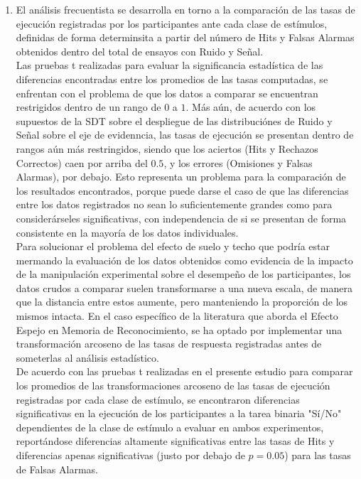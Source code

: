 \begin{enumerate}
\item El análisis frecuentista se desarrolla en torno a la comparación de las tasas de ejecución registradas por los participantes ante cada clase de estímulos, definidas de forma determinsita a partir del número de Hits y Falsas Alarmas obtenidos dentro del total de ensayos con Ruido y Señal.\\

Las pruebas t realizadas para evaluar la significancia estadística de las diferencias encontradas entre los promedios de las tasas computadas, se enfrentan con el problema de que los datos a comparar se encuentran restrigidos dentro de un rango de $0$ a $1$. Más aún, de acuerdo con los supuestos de la SDT sobre el despliegue de las distribuciónes de Ruido y Señal sobre el eje de evidenncia, las tasas de ejecución se presentan dentro de rangos aún más restringidos, siendo que los aciertos (Hits y Rechazos Correctos) caen por arriba del $0.5$, y los errores (Omisiones y Falsas Alarmas), por debajo. Esto representa un problema para la comparación de los resultados encontrados, porque puede darse el caso de que las diferencias entre los datos registrados no sean lo suficientemente grandes como para considerárseles significativas, con independencia de si se presentan de forma consistente en la mayoría de los datos individuales.\\

Para solucionar el problema del efecto de suelo y techo que podría estar mermando la evaluación de los datos obtenidos como evidencia de la impacto de la manipulación experimental sobre el desempeño de los participantes, los datos crudos a comparar suelen transformarse a una nueva escala, de manera que la distancia entre estos aumente, pero manteniendo la proporción de los mismos intacta. En el caso específico de la literatura que aborda el Efecto Espejo en Memoria de Reconocimiento, se ha optado por implementar una transformación arcoseno de las tasas de respuesta registradas antes de someterlas al análisis estadístico.\\

De acuerdo con las pruebas t realizadas en el presente estudio para comparar los promedios de las transformaciones arcoseno de las tasas de ejecución registradas por cada clase de estímulo, se encontraron diferencias significativas en la ejecución de los participantes a la tarea binaria "Sí/No" dependientes de la clase de estímulo a evaluar en ambos experimentos, reportándose diferencias altamente significativas entre las tasas de Hits y diferencias apenas significativas (justo por debajo de $p=0.05$) para las tasas de Falsas Alarmas.\\


\end{enumerate}
